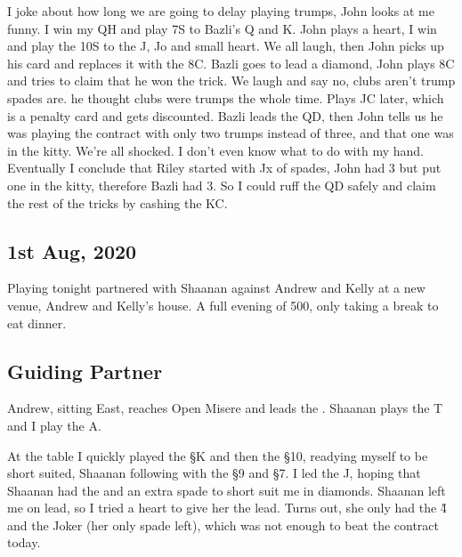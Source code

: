 \documentclass[a4paper]{JoshCards}
\begin{document}
I joke about how long we are going to delay playing trumps, John looks at me funny. I win my QH and play 7S to Bazli's Q and K. John plays a heart, I win and play the 10S to the J, Jo and small heart. We all laugh, then John picks up his card and replaces it with the 8C. Bazli goes to lead a diamond, John plays 8C and tries to claim that he won the trick. We laugh and say no, clubs aren't trump spades are. he thought clubs were trumps the whole time. Plays JC later, which is a penalty card and gets discounted. Bazli leads the QD, then John tells us he was playing the contract with only two trumps instead of three, and that one was in the kitty. We're all shocked. I don't even know what to do with my hand. Eventually I conclude that Riley started with Jx of spades, John had 3 but put one in the kitty, therefore Bazli had 3. So I could ruff the QD safely and claim the rest of the tricks by cashing the KC.

\gamefont{\larger}
\leftupper{}%
{}{}
\rightupper{\contract:
7\Sp}{\declarer: \east}{}
\showAll*



\subsection*{1st Aug, 2020}

Playing tonight partnered with Shaanan against Andrew and Kelly at a new venue, Andrew and Kelly's house. A full evening of 500, only taking a break to eat dinner.

\subsection*{Guiding Partner}

\gamefont{\larger}
\northhand{}{}{}{}
\easthand{}{}{}{}
\leftupper{}%
{}{}
\rightupper{}{}{}
\rightlower{}{}{}
\showAll*

Andrew, sitting East, reaches Open Misere and leads the . Shaanan plays the \C T and I play the \C A.

At the table I quickly played the \S K and then the \S10, readying myself to be short suited, Shaanan following with the \S 9 and \S 7. I led the \D J, hoping that Shaanan had the  and an extra spade to short suit me in diamonds. Shaanan left me on lead, so I tried a heart to give her the lead. Turns out, she only had the \H 4 and the Joker (her only spade left), which was not enough to beat the contract today.
\end{document}
